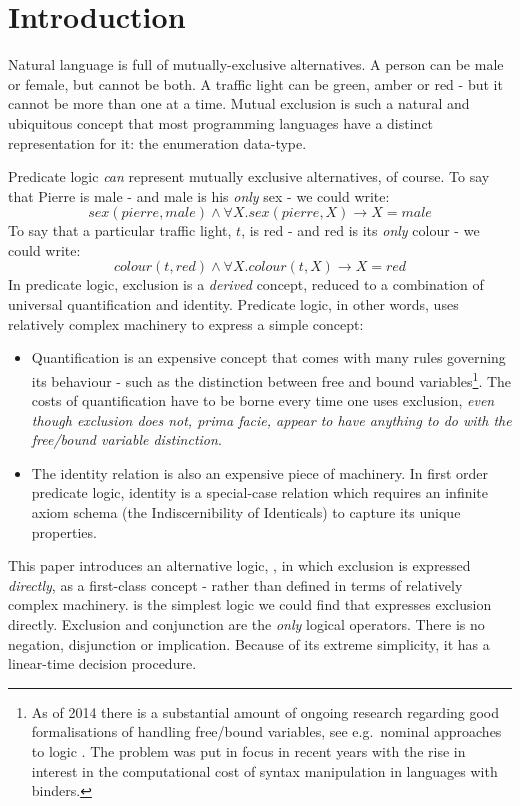 \section{Introduction}\label{introduction}

Natural language is full of mutually-exclusive alternatives.
A person can be male or female, but cannot be both.
A traffic light can be green, amber or red - but it cannot be more than one at a time.
Mutual exclusion is such a natural and ubiquitous concept that most programming languages have a distinct representation for it: the enumeration data-type.

Predicate logic \emph{can} represent mutually exclusive alternatives, of course.
To say that Pierre is male - and male is his \emph{only} sex - we could write:
\[
sex(pierre, male) \land \forall X . sex(pierre, X) \rightarrow X = male
\]
To say that a particular traffic light, $t$, is red - and red is its \emph{only} colour - we could write:
\[
colour(t, red) \land \forall X . colour(t, X) \rightarrow X = red
\]
In predicate logic, exclusion is a \emph{derived} concept, reduced to a combination of universal quantification and identity.
Predicate logic, in other words, uses relatively complex machinery to express a simple concept:
\begin{itemize}
\item Quantification is an expensive concept that comes with
      many rules governing its behaviour - such as the distinction
      between free and bound variables\footnote{As of 2014 there is a substantial amount
      of ongoing research regarding good formalisations of handling
      free/bound variables, see e.g.~nominal approaches to
      logic \cite{PittsAM:newaas,PittsAM:nomsetnasics}. The problem
      was put in focus in recent years with the rise in interest in the
      computational cost of syntax manipulation in languages with
      binders.}. The costs of quantification have to be
      borne every time one uses exclusion, \emph{even though exclusion does
      not, prima facie, appear to have anything to do with the
      free/bound variable distinction}.
\item The identity relation is also an expensive piece of machinery. In first order predicate logic, identity is a special-case relation which requires an infinite axiom schema (the Indiscernibility of Identicals) to capture its unique properties.
\end{itemize}

This paper introduces an alternative logic, \ELFULL{}, in which exclusion is expressed \emph{directly}, as a first-class concept - rather than defined in terms of relatively complex machinery.
\ELFULL{} is the simplest logic we could find that expresses exclusion directly. 
Exclusion and conjunction are the \emph{only} logical operators. 
There is no negation, disjunction or implication.
Because of its extreme simplicity, it has a linear-time decision procedure.

